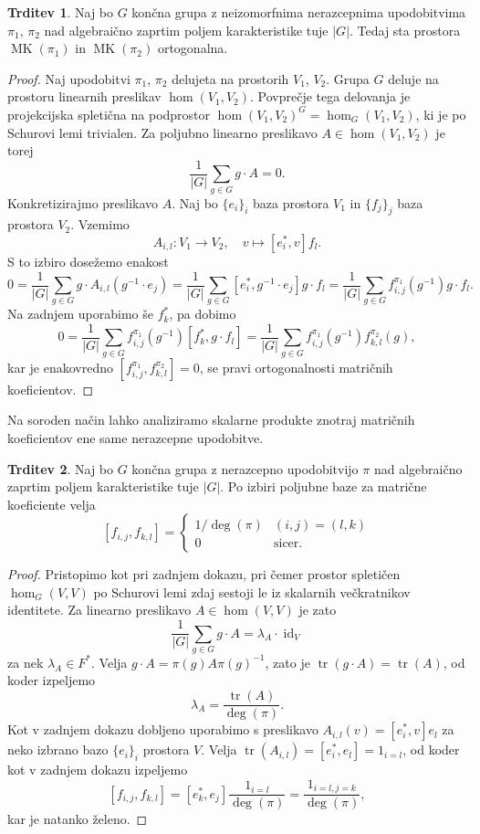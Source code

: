 \documentclass[11pt]{book}
\DeclareMathOperator\MK{MK}
\DeclareMathOperator\tr{tr}
\DeclareMathOperator\id{id}
\theoremstyle{definition}
\theoremstyle{zgled}
\theoremstyle{odprtproblem}
\theoremstyle{domacanaloga}
\newenvironment{dokaz}
    {\color{siva}\begin{proof}}
    {\end{proof}}
\theoremstyle{izrek}
\newtheorem*{trditev}{Trditev}
\begin{document}
\begin{trditev}
Naj bo $G$ končna grupa z neizomorfnima nerazcepnima upodobitvima $\pi_1$, $\pi_2$ nad algebraično zaprtim poljem karakteristike tuje $|G|$. Tedaj sta prostora $\MK(\pi_1)$ in $\MK(\pi_2)$ ortogonalna.
\end{trditev}
\begin{dokaz}
Naj upodobitvi $\pi_1$, $\pi_2$ delujeta na prostorih $V_1$, $V_2$. Grupa $G$ deluje na prostoru linearnih preslikav $\hom(V_1, V_2)$. Povprečje tega delovanja je projekcijska spletična na podprostor $\hom(V_1, V_2)^G = \hom_G(V_1, V_2)$, ki je po Schurovi lemi trivialen. Za poljubno linearno preslikavo $A \in \hom(V_1, V_2)$ je torej
\[
    \frac{1}{|G|} \sum_{g \in G} g \cdot A = 0.
\]
Konkretizirajmo preslikavo $A$. Naj bo $\{ e_i \}_i$ baza prostora $V_1$ in $\{ f_j \}_j$ baza prostora $V_2$. Vzemimo
\[
    A_{i,l} \colon V_1 \to V_2, \quad
    v \mapsto [ e_i^*, v ] f_l.
\]
S to izbiro dosežemo enakost
\[
    0 = \frac{1}{|G|} \sum_{g \in G} g \cdot A_{i,l}(g^{-1} \cdot e_j) =
    \frac{1}{|G|} \sum_{g \in G} [ e_i^*, g^{-1} \cdot e_j ] g \cdot f_l =
    \frac{1}{|G|} \sum_{g \in G} f_{i,j}^{\pi_1}(g^{-1}) g \cdot f_l.
\]
Na zadnjem uporabimo še $f_k^*$, pa dobimo
\[
    0 = \frac{1}{|G|} \sum_{g \in G} f_{i,j}^{\pi_1}(g^{-1}) [ f_k^*, g \cdot f_l ] =
    \frac{1}{|G|} \sum_{g \in G} f_{i,j}^{\pi_1}(g^{-1}) f_{k,l}^{\pi_2}(g),
\]
kar je enakovredno $[ f_{i,j}^{\pi_1}, f_{k,l}^{\pi_2} ] = 0$, se pravi ortogonalnosti matričnih koeficientov.
\end{dokaz}

Na soroden način lahko analiziramo skalarne produkte znotraj matričnih koeficientov ene same nerazcepne upodobitve.

\begin{trditev}
Naj bo $G$ končna grupa z nerazcepno upodobitvijo $\pi$ nad algebraično zaprtim poljem karakteristike tuje $|G|$. Po izbiri poljubne baze za matrične koeficiente velja
\[
    [ f_{i,j}, f_{k,l} ] = 
    \begin{cases}
        1/\deg(\pi) & (i,j) = (l,k) \\
        0 & \text{sicer.}
    \end{cases}
\]
\end{trditev}
\begin{dokaz}
Pristopimo kot pri zadnjem dokazu, pri čemer prostor spletičen $\hom_G(V,V)$ po Schurovi lemi zdaj sestoji le iz skalarnih večkratnikov identitete. Za linearno preslikavo $A \in \hom(V,V)$ je zato
\[
    \frac{1}{|G|} \sum_{g \in G} g \cdot A = \lambda_A \cdot \id_V
\]
za nek $\lambda_A \in F^*$. Velja $g \cdot A = \pi(g) A \pi(g)^{-1}
$, zato je $\tr(g \cdot A) = \tr(A)$, od koder izpeljemo
\[
    \lambda_A = \frac{\tr(A)}{\deg(\pi)}.
\]
Kot v zadnjem dokazu dobljeno uporabimo s preslikavo $A_{i,l}(v) = [ e_i^*, v ] e_l$ za neko izbrano bazo $\{ e_i \}_i$ prostora $V$. Velja $\tr(A_{i,l}) = [ e_i^*, e_l ] = 1_{i = l}$, od koder kot v zadnjem dokazu izpeljemo
\[
    [ f_{i,j}, f_{k,l} ] = [ e_k^*, e_j ] \frac{1_{i = l}}{\deg(\pi)} = \frac{1_{i = l, j = k}}{\deg(\pi)},
\]
kar je natanko želeno.
\end{dokaz}
\end{document}
